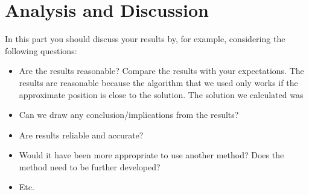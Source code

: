 \section{Analysis and Discussion} %
\label{sec:analysis_and_discussion}
In this part you should discuss your results by, for example, considering the following questions:
\begin{itemize}
	\item Are the results reasonable? Compare the results with your expectations.
	The results are reasonable because the algorithm that we used only works if the approximate position is close to the solution.  The solution we calculated was 
	\item Can we draw any conclusion/implications from the results?
	\item Are results reliable and accurate?
	\item Would it have been more appropriate to use another method? Does the method need to be further developed?
	\item Etc.
\end{itemize}

